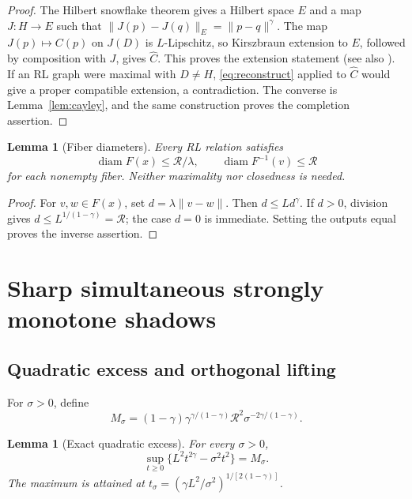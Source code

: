 \documentclass[11pt]{article}
\numberwithin{equation}{section}
\newtheorem{lemma}[theorem]{Lemma}
\theoremstyle{definition}
\theoremstyle{remark}
\newcommand{\diam}{\operatorname{diam}}
\newcommand{\rad}{\mathcal R}
\newcommand{\norm}[1]{\lVert #1\rVert}
\begin{document}
\begin{proof}
The Hilbert snowflake theorem \cite{Schoenberg} gives a Hilbert space $E$
and a map $J:H\to E$ such that
$\norm{J(p)-J(q)}_E=\norm{p-q}^\gamma$.
The map $J(p)\mapsto C(p)$ on $J(D)$ is $L$-Lipschitz, so Kirszbraun
extension to $E$, followed by composition with $J$, gives $\widehat C$.
This proves the extension statement (see also \cite{Minty1970}).
If an RL graph were maximal with $D\ne H$, \eqref{eq:reconstruct} applied
to $\widehat C$ would give a proper compatible extension, a contradiction.
The converse is Lemma~\ref{lem:cayley}, and the same construction proves
the completion assertion.
\end{proof}

\begin{lemma}[Fiber diameters]\label{lem:diameters}
Every RL relation satisfies
\begin{equation}\label{eq:diameters}
 \diam F(x)\le\rad/\lambda,\qquad
 \diam F^{-1}(v)\le\rad
\end{equation}
for each nonempty fiber. Neither maximality nor closedness is needed.
\end{lemma}

\begin{proof}
For $v,w\in F(x)$, set $d=\lambda\norm{v-w}$. Then $d\le Ld^\gamma$.
If $d>0$, division gives $d\le L^{1/(1-\gamma)}=\rad$; the case $d=0$
is immediate. Setting the outputs equal proves the inverse assertion.
\end{proof}

\section{Sharp simultaneous strongly monotone shadows}\label{sec:shadow}

\subsection{Quadratic excess and orthogonal lifting}

For $\sigma>0$, define
\begin{equation}\label{eq:M}
 M_\sigma=(1-\gamma)\gamma^{\gamma/(1-\gamma)}
            \rad^2\sigma^{-2\gamma/(1-\gamma)}.
\end{equation}

\begin{lemma}[Exact quadratic excess]\label{lem:excess}
For every $\sigma>0$,
\begin{equation}\label{eq:excess}
 \sup_{t\ge0}\{L^2t^{2\gamma}-\sigma^2t^2\}=M_\sigma.
\end{equation}
The maximum is attained at
$t_\sigma=(\gamma L^2/\sigma^2)^{1/[2(1-\gamma)]}$.
\end{lemma}
\end{document}
